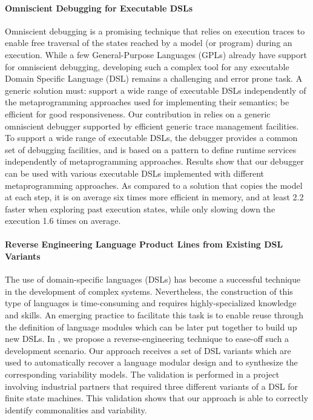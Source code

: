 \paragraph{Omniscient Debugging for Executable DSLs}

Omniscient debugging is a promising technique that relies on execution traces to enable free traversal of the states reached by a model (or program) during an execution. While a few General-Purpose Languages (GPLs) already have support for omniscient debugging, developing such a complex tool for any executable Domain Specific Language (DSL) remains a challenging and error prone task. A generic solution must: support a wide range of executable DSLs independently of the metaprogramming approaches used for implementing their semantics; be efficient for good responsiveness. Our contribution in \cite{bousse:hal-01662336} relies on a generic omniscient debugger supported by efficient generic trace management facilities. To support a wide range of executable DSLs, the debugger provides a common set of debugging facilities, and is based on a pattern to define runtime services independently of metaprogramming approaches. Results show that our debugger can be used with various executable DSLs implemented with different metaprogramming approaches. As compared to a solution that copies the model at each step, it is on average six times more efficient in memory, and at least 2.2 faster when exploring past execution states, while only slowing down the execution 1.6 times on average.

\paragraph{Reverse Engineering Language Product Lines from Existing DSL Variants}

The use of domain-specific languages (DSLs) has become a successful technique in the development of complex systems. Nevertheless, the construction of this type of languages is time-consuming and requires highly-specialized knowledge and skills. An emerging practice to facilitate this task is to enable reuse through the definition of language modules which can be later put together to build up new DSLs. 
In \cite{mendezacuna:hal-01524632}, we propose a reverse-engineering technique to ease-off such a development scenario. Our approach receives a set of DSL variants which are used to automatically recover a language modular design and to synthesize the corresponding variability models. The validation is performed in a project involving industrial partners that required three different variants of a DSL for finite state machines. This validation shows that our approach is able to correctly identify commonalities and variability.

